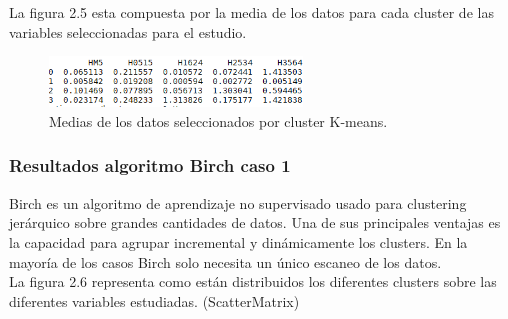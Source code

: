 	La figura 2.5 esta compuesta por la media de los datos para cada cluster de las variables seleccionadas
	para el estudio. \\ 

	\begin{figure}[htb]
		\centering
		\includegraphics[width=0.6\textwidth]{./imagenes/caso1/medias_datos_caso1_K-means}
		\caption{Medias de los datos seleccionados por cluster K-means.} \label{fig:1}
	\end{figure}



	\subsubsection{Resultados algoritmo Birch caso 1}

	Birch es un algoritmo de aprendizaje no supervisado usado para clustering jerárquico sobre
	grandes cantidades de datos. Una de sus principales ventajas es la capacidad para agrupar 
	incremental y dinámicamente los clusters. En la mayoría de los casos Birch solo necesita un único 
	escaneo de los datos. \\


	La figura 2.6 representa como están distribuidos los diferentes clusters sobre las diferentes variables estudiadas. (ScatterMatrix)\\

